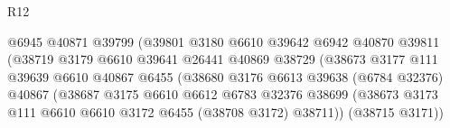 \begin{lexlean}{R12}
\begin{coremodule}
                                          @6945
                                          @40871
                                          @39799
                                          (@39801
                                            @3180
                                            @6610
                                            @39642
                                            @6942
                                            @40870
                                            @39811
                                            (@38719
                                              @3179
                                              @6610
                                              @39641
                                              @26441
                                              @40869
                                              @38729
                                              (@38673
                                                @3177
                                                @111
                                                @39639
                                                @6610
                                                @40867
                                                @6455
                                                (@38680
                                                  @3176
                                                  @6613
                                                  @39638
                                                  (@6784 @32376)
                                                  @40867
                                                  (@38687
                                                    @3175
                                                    @6610
                                                    @6612
                                                    @6783
                                                    @32376
                                                    @38699
                                                    (@38673
                                                      @3173
                                                      @111
                                                      @6610
                                                      @6610
                                                      @3172
                                                      @6455
                                                      (@38708 @3172)
                                                      @38711))
                                                  (@38715 @3171))

\end{coremodule}
\end{lexlean}

